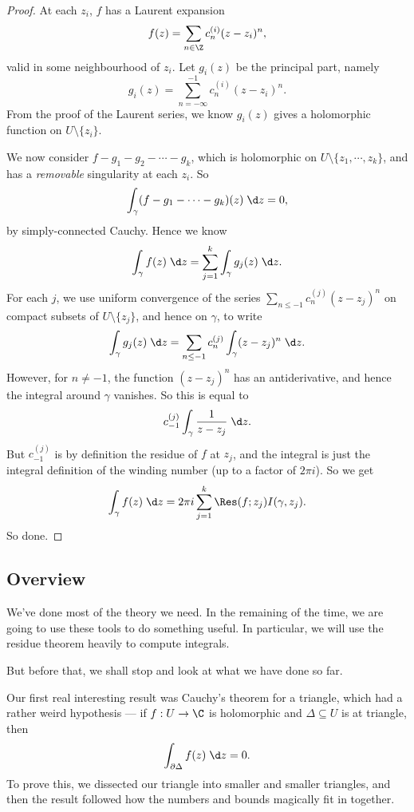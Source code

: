 \documentclass[a4paper]{article}
\begin{document}
\begin{proof}
  At each $z_i$, $f$ has a Laurent expansion
  \[
    f(z) = \sum_{n \in \Z} c_n^{(i)} (z - z_i)^n,
  \]
  valid in some neighbourhood of $z_i$. Let $g_i(z)$ be the principal part, namely
  \[
    g_i(z) = \sum_{n = -\infty}^{-1} c_n^{(i)}(z - z_i)^n.
  \]
  From the proof of the Laurent series, we know $g_i(z)$ gives a holomorphic function on $U \setminus \{z_i\}$.

  We now consider $f - g_1 - g_2 - \cdots - g_k$, which is holomorphic on $U \setminus \{z_1, \cdots, z_k\}$, and has a \emph{removable} singularity at each $z_i$. So
  \[
    \int_\gamma (f - g_1 - \cdots - g_k)(z)\;\d z = 0,
  \]
  by simply-connected Cauchy. Hence we know
  \[
    \int_\gamma f(z)\;\d z = \sum_{j = 1}^k \int_\gamma g_j(z)\;\d z.
  \]
  For each $j$, we use uniform convergence of the series $\sum_{n \leq -1} c_n^{(j)} (z - z_j)^n$ on compact subsets of $U \setminus \{z_j\}$, and hence on $\gamma$, to write
  \[
    \int_\gamma g_j(z)\;\d z = \sum_{n \leq -1} c_n^{(j)} \int_\gamma (z - z_j)^n\;\d z.
  \]
  However, for $n \not= -1$, the function $(z - z_j)^n$ has an antiderivative, and hence the integral around $\gamma$ vanishes. So this is equal to
  \[
    c_{-1}^{(j)} \int_\gamma \frac{1}{z - z_j}\;\d z.
  \]
  But $c_{-1}^{(j)}$ is by definition the residue of $f$ at $z_j$, and the integral is just the integral definition of the winding number (up to a factor of $2\pi i$). So we get
  \[
    \int_\gamma f(z)\;\d z = 2\pi i \sum_{j = 1}^k \Res(f; z_j) I(\gamma, z_j).
  \]
  So done.
\end{proof}

\subsection{Overview}
We've done most of the theory we need. In the remaining of the time, we are going to use these tools to do something useful. In particular, we will use the residue theorem heavily to compute integrals.

But before that, we shall stop and look at what we have done so far.

Our first real interesting result was Cauchy's theorem for a triangle, which had a rather weird hypothesis --- if $f: U \to \C$ is holomorphic and $\Delta \subseteq U$ is at triangle, then
\[
  \int_{\partial \Delta} f(z)\;\d z = 0.
\]
To prove this, we dissected our triangle into smaller and smaller triangles, and then the result followed how the numbers and bounds magically fit in together.
\end{document}
